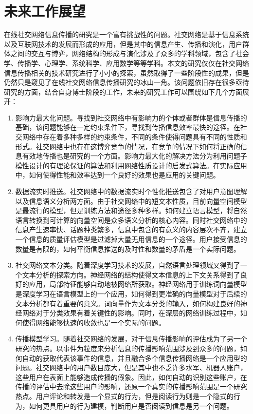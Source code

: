 \section{未来工作展望}
在线社交网络信息传播的研究是一个富有挑战性的问题。社交网络是基于信息系统以及互联网技术的发展而形成的应用，但是其中的信息产生、传播和演化，用户群体之间的交互与博弈，网络结构的形成与演化涉及了众多的学科领域，包含了社会学、传播学、心理学、系统科学、应用数学等等学科。本文的研究仅仅在社交网络信息传播相关的技术研究进行了小小的探索，虽然取得了一些阶段性的成果，但是仍然只是窥见了在线社交网络信息传播研究的冰山一角。该问题依旧存在很多亟待研究的方面，结合自身博士阶段的工作，未来的研究工作可以围绕如下几个方面展开：
\begin{enumerate}
	\item 影响力最大化问题。寻找到社交网络中有影响力的个体或者群体是信息传播的基础，该问题能够在一定约束条件下，寻找到传播信息效率最快的途径。在社交网络中存在着多种多样的约束条件，不同的条件使得问题具有不同的性质和形式。社交网络中也存在这博弈竞争的情况，在竞争的情况下如何将正确的信息有效地传播也是研究的一个方面。影响力最大化的解决方法分为利用问题子模性设计的有理论保证的算法和利用网络性质设计的启发式算法。在实际应用中，如何使得性能和效率达到一个良好的效果也是应用的关键问题。
	\item 数据流实时推送。社交网络中的数据流实时个性化推送包含了对用户意图理解以及信息语义分析两方面。由于社交网络中的短文本性质，目前向量空间模型是最流行的模型，但是训练方法和途径多种多样。如何建立语言模型，将自然语言转换到可计算的向量空间是众多语义分析的核心内容。同时社交网络中的信息产生速率快、话题种类繁多，信息中包含的有意义的内容层次不齐，建立一个信息的质量评估模型是过滤掉大量无用信息的一个途径。用户接受信息的数量是有限的，如何平衡信息推送的及时性和数量的矛盾是一个实际问题。
	\item 社交网络文本分类。随着深度学习技术的发展，自然语言处理领域又得到了一个文本分析的探索方向。神经网络的结构使得文本信息的上下文关系得到了良好的应用，局部特征能够自动地被网络所获取。神经网络用于训练词向量模型是深度学习在语言模型上的一个应用，如何得到更准确的向量模型对于后续的文本分析都有着重要的意义。词向量作为文本分类的输入，如何构建良好的神经网络对于分类效果有着关键性的影响。同时，在深层的网络训练过程中，如何使得网络能够快速的收敛也是一个实际的问题。
	\item 传播模型学习。随着社交网络的发展，对于信息传播影响的评估成为了另一个研究的热点。以事件为粒度来分析信息的传播影响范围涉及到众多的问题，如何自动的获取代表该事件的信息，并且融合多个信息传播网络是一个应用型的问题。社交网络中的用户数目庞大，但是其中也不乏许多水军、机器人账户，这些用户在表面上能够造成传播的假象。因此，如何自动的识别这些账户，在传播的评估中去除这些用户的影响，还原一个真实的传播影响范围是一个研究热点。用户评论和转发是一个显式的行为，但是阅读行为则是一个隐式的行为，如何更具用户的行为建模，判断用户是否阅读到信息是另一个问题。
\end{enumerate}